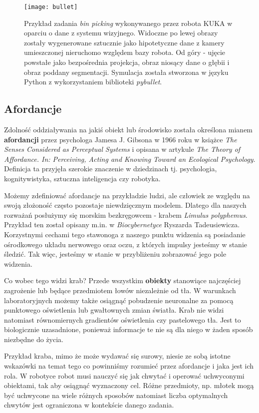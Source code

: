 \documentclass[12pt]{article}
\begin{document}
\begin{figure}[h]
\texttt{[image: bullet]}
\caption{Przykład zadania \emph{bin picking} wykonywanego przez robota KUKA w oparciu o dane z systemu wizyjnego. Widoczne po lewej obrazy zostały wygenerowane sztucznie jako hipotetyczne dane z kamery umieszczonej nieruchomo względem bazy robota. Od góry - ujęcie powstałe jako bezpośrednia projekcja, obraz niosący dane o głębii i obraz poddany segmentacji. Symulacja została stworzona w języku Python z wykorzystaniem biblioteki \emph{pybullet}.}
\end{figure}

\newpage
\subsection{Afordancje}
Zdolność oddziaływania na jakiś obiekt lub środowisko została określona mianem \textbf{afordancji} przez psychologa Jamesa J. Gibsona w 1966 roku w książce \emph{The Senses Considered as Perceptual Systems} i opisana w artykule \emph{The  Theory  of  Affordance.  In:  Perceiving,  Acting  and  Knowing  Toward  an Ecological Psychology}. Definicja ta przyjęła szerokie znaczenie w dziedzinach tj. psychologia, kognitywistyka, sztuczna inteligencja czy robotyka.

Możemy zdefiniować afordancje na przykładzie ludzi, ale człowiek ze względu na swoją złożoność często pozostaje niewdzięcznym modelem. Dlatego dla naszych rozważań posłużymy się morskim bezkręgowcem - krabem \emph{Limulus polyphemus}. Przykład ten został opisany m.in. w \emph{Biocybernetyce} Ryszarda Tadeusiewicza. Korzystnymi cechami tego stawonoga z naszego punktu widzenia są posiadanie ośrodkowego układu nerwowego oraz oczu, z których impulsy jesteśmy w stanie śledzić. Tak więc, jesteśmy w stanie w przybliżeniu zobrazować jego pole widzenia. 

Co wobec tego widzi krab? Przede wszystkim \textbf{obiekty} stanowiące najczęściej zagrożenie lub będące przedmiotem łowów niezależnie od tła. W warunkach laboratoryjnych możemy także osiągnąć pobudzenie neuronalne za pomocą punktowego oświetlenia lub gwałtownych zmian światła. Krab nie widzi natomiast równomiernych gradientów oświetlenia czy pastelowego tła. Jest to biologicznie uzasadnione, ponieważ informacje te nie są dla niego w żaden sposób niezbędne do życia. 

Przykład kraba, mimo że może wydawać się surowy, niesie ze sobą istotne wskazówki na temat tego co powinniśmy rozumieć przez afordancje i jaka jest ich rola. W robotyce robot musi nauczyć się jak chwytać i operować uchwyconymi obiektami, tak aby osiągnąć wyznaczony cel. Różne przedmioty, np. młotek mogą być uchwycone na wiele różnych sposobów natomiast liczba optymalnych chwytów jest ograniczona w kontekście danego zadania.
\end{document}
